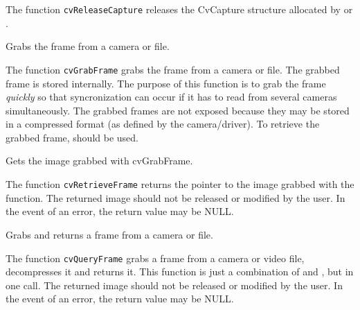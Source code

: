 The function \texttt{cvReleaseCapture} releases the CvCapture structure allocated by  or .
\fi


Grabs the frame from a camera or file.


\begin{description}
\end{description}

The function \texttt{cvGrabFrame} grabs the frame from a camera or file. The grabbed frame is stored internally. The purpose of this function is to grab the frame \emph{quickly} so that syncronization can occur if it has to read from several cameras simultaneously. The grabbed frames are not exposed because they may be stored in a compressed format (as defined by the camera/driver). To retrieve the grabbed frame,  should be used.


Gets the image grabbed with cvGrabFrame.


\begin{description}
\end{description}

The function \texttt{cvRetrieveFrame} returns the pointer to the image grabbed with the  function. The returned image should not be released or modified by the user.  In the event of an error, the return value may be NULL.


Grabs and returns a frame from a camera or file.


\begin{description}
\end{description}

The function \texttt{cvQueryFrame} grabs a frame from a camera or video file, decompresses it and returns it. This function is just a combination of  and , but in one call. The returned image should not be released or modified by the user.  In the event of an error, the return value may be NULL.

